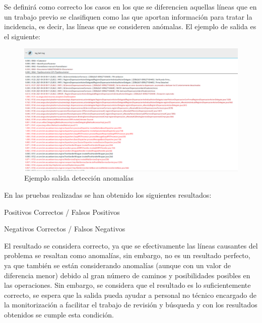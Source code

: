 Se definirá como correcto los casos en los que se diferencien aquellas líneas que en un trabajo previo se clasifiquen como las que aportan información para tratar la incidencia, es decir, las líneas que se consideren anómalas. El ejemplo de salida es el siguiente:

\begin{figure}[H]
\centerline{\includegraphics[width=15cm]{figuras/report.png}}
\caption{Ejemplo salida detección anomalías}
\label{enlace1}
\end{figure}


En las pruebas realizadas se han obtenido los siguientes resultados:

Positivos Correctos / Falsos Positivos

Negativos Correctos / Falsos Negativos


El resultado se considera correcto, ya que se efectivamente las líneas causantes del problema se resaltan como anomalías, sin embargo, no es un resultado perfecto, ya que también se están considerando anomalías (aunque con un valor de diferencia menor) debido al gran número de caminos y posibilidades posibles en las operaciones. Sin embargo, se considera que el resultado es lo suficientemente correcto, se espera que la salida pueda ayudar a personal no técnico encargado de la monitorización a facilitar el trabajo de revisión y búsqueda y con los resultados obtenidos se cumple esta condición.


